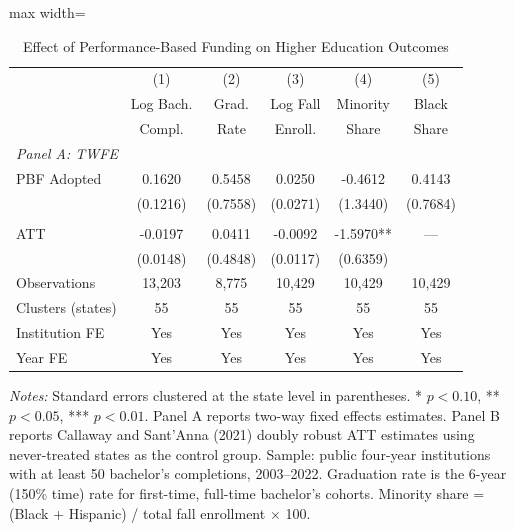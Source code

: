 \begin{table}[H]
\centering
\caption{Effect of Performance-Based Funding on Higher Education Outcomes}
\label{tab:main}
\begin{threeparttable}
\begin{adjustbox}{max width=\textwidth}
\begin{tabular}{lccccc}
\toprule
 & (1) & (2) & (3) & (4) & (5) \\
 & Log Bach. & Grad. & Log Fall & Minority & Black \\
 & Compl. & Rate & Enroll. & Share & Share \\
\midrule
\multicolumn{6}{l}{\textit{Panel A: TWFE}} \\
PBF Adopted & 0.1620 & 0.5458 & 0.0250 & -0.4612 & 0.4143 \\
  & (0.1216) & (0.7558) & (0.0271) & (1.3440) & (0.7684) \\
\addlinespace
\multicolumn{6}{l}{\textit{Panel B: Callaway-Sant'Anna}} \\
ATT & -0.0197 & 0.0411 & -0.0092 & -1.5970** & --- \\
  & (0.0148) & (0.4848) & (0.0117) & (0.6359) & \\
\addlinespace
\midrule
Observations & 13,203 & 8,775 & 10,429 & 10,429 & 10,429 \\
Clusters (states) & 55 & 55 & 55 & 55 & 55 \\
Institution FE & Yes & Yes & Yes & Yes & Yes \\
Year FE & Yes & Yes & Yes & Yes & Yes \\
\bottomrule
\end{tabular}
\end{adjustbox}
\begin{tablenotes}[flushleft]
\small
\item \textit{Notes:} Standard errors clustered at the state level in parentheses. * $p<0.10$, ** $p<0.05$, *** $p<0.01$. Panel A reports two-way fixed effects estimates. Panel B reports Callaway and Sant'Anna (2021) doubly robust ATT estimates using never-treated states as the control group. Sample: public four-year institutions with at least 50 bachelor's completions, 2003--2022. Graduation rate is the 6-year (150\% time) rate for first-time, full-time bachelor's cohorts. Minority share = (Black + Hispanic) / total fall enrollment $\times$ 100.
\end{tablenotes}
\end{threeparttable}
\end{table}
